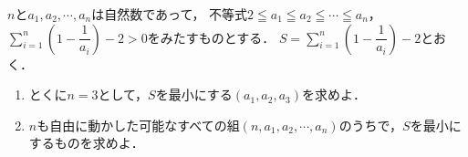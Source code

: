 \documentclass[../../main.tex]{subfiles}
\begin{document}
$n$と$a_1,a_2,\cdots,a_n$は自然数であって，
不等式$2 \leqq a_1 \leqq a_2 \leqq \cdots \leqq a_n$，
$\displaystyle \sum_{i=1}^n \left( 1-\dfrac{1}{a_i} \right) -2>0$をみたすものとする．
$\displaystyle S=\sum_{i=1}^n \left( 1-\dfrac{1}{a_i} \right) -2$とおく．
\begin{enumerate}
  \item とくに$n=3$として，$S$を最小にする$(a_1,a_2,a_3)$を求めよ．
  \item $n$も自由に動かした可能なすべての組$(n,a_1,a_2,\cdots,a_n)$のうちで，$S$を最小にするものを求めよ．
\end{enumerate}
\end{document}
